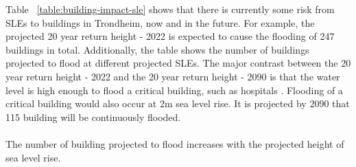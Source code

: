 Table ~\ref{table:building-impact-sle} shows that there is currently some risk from SLEs to buildings in Trondheim, now and in the future. For example, the projected 20 year return height - 2022 is expected to cause the flooding of 247 buildings in total. Additionally, the table shows the number of buildings projected to flood at different projected SLEs. The major contrast between the 20 year return height - 2022 and the 20 year return height - 2090 is that the water level is high enough to flood a critical building, such as hospitals . Flooding of a critical building would also occur at 2m sea level rise. It is projected by 2090 that 115 building will be continuously flooded.
\paragraph{}
The number of building projected to flood increases with the projected height of sea level rise. 
